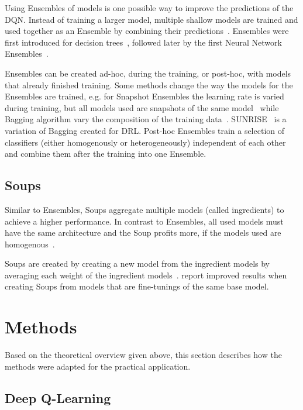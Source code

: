 Using Ensembles of models is one possible way to improve the predictions of the DQN. Instead of training a larger model,  multiple shallow models are trained and used together as an Ensemble by combining their predictions~\parencite{kwok_multiple_1990,hansen_neural_1990,breiman_bagging_1996}. Ensembles were first introduced for decision trees~\parencite{kwok_multiple_1990}, followed later by the first Neural Network Ensembles~\parencite{hansen_neural_1990}.

Ensembles can be created ad-hoc, during the training, or post-hoc, with models that already finished training. Some methods change the way the models for the Ensembles are trained, e.g. for Snapshot Ensembles the learning rate is varied during training, but all models used are snapshots of the same model~\parencite{huang_snapshot_2017} while Bagging algorithm vary the composition of the training data~\parencite{breiman_bagging_1996}. SUNRISE~\parencite{lee_sunrise_2021} is a variation of Bagging created for DRL. Post-hoc Ensembles train a selection of classifiers (either homogenously or heterogeneously) independent of each other and combine them after the training into one Ensemble.

\section{Soups}

Similar to Ensembles, Soups aggregate multiple models (called ingredients) to achieve a higher performance. In contrast to Ensembles, all used models must have the same architecture and the Soup profits more, if the models used are homogenous~\parencite{wortsman_model_2022}.

Soups are created by creating a new model from the ingredient models by averaging each weight of the ingredient models~\parencite{wortsman_model_2022}. \textcite{wortsman_model_2022} report improved results when creating Soups from models that are fine-tunings of the same base model.

\chapter{Methods}

Based on the theoretical overview given above, this section describes how the methods were adapted for the practical application.

\section{Deep Q-Learning}

